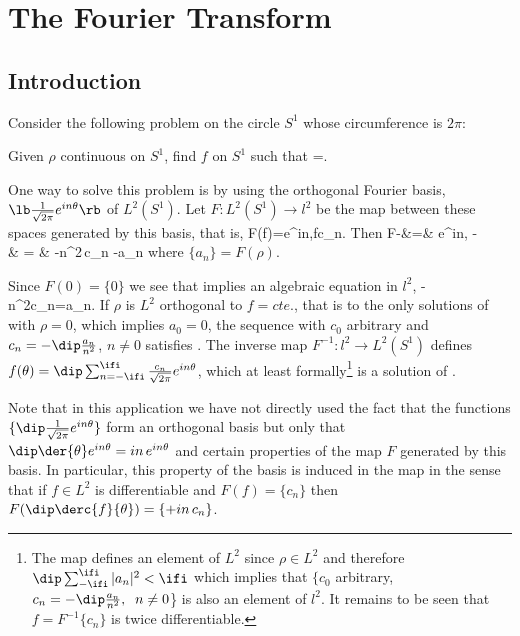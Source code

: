 

\chapter{The Fourier Transform}


\section{Introduction}

Consider the following problem on the circle $S^1$ whose
circumference is $2\pi$:

\noi Given $\rho$ continuous on $S^1$, find $f$ on $S^1$ such that 
 \beq
 =\rho. \label{10.1*}
 \eeq
 
\noi One way to solve this problem is by using the orthogonal
Fourier basis, 
$\lb\frac{1}{\sqrt{2\pi}}e^{in\theta}\rb$ of $L^2(S^1)$.
Let $F:L^2(S^1)\to l^2$ be the map between these spaces generated by this 
basis, that is,
\beq
F(f)=\lb\langle {}e^{in\theta},f\rangle \rb\equiv\lb c_n\rb .
\eeq
Then 
\beq
{}
F\lp{}-\rho\rp &=& \lb\langle {}e^{in\theta},
-\rho\rangle \rb \\ [3mm]
& = & \lb-n^2\,c_n -a_n\rb
\earr
\eeq
where $\{a_n\}=F(\rho)$.

Since $F(0)=\{0\}$ we see that  implies an algebraic 
equation in $l^2$,
\beq
-n^2c_n=a_n.\label{10.2*}
\eeq
If $\rho$ is $L^2$ orthogonal to $f=cte.$, that is to the only solutions of 
with $\rho=0$, which implies $a_0=0$, the sequence with $c_0$
arbitrary and
$c_n=-\dip\frac{a_n}{n^2}$, $n\neq0$ satisfies
. 
The inverse map $F^{-1}:l^2\to L^2(S^1)$ defines 
$f(\theta)=\dip\sum_{n=-\ifi}^{\ifi}\frac{c_n}{\sqrt{2\pi}}e^{in\theta} $,
which at least formally\footnote{The map defines
an element of $L^2$ since $\rho\in L^2$ and therefore $\dip
\sum_{-\ifi}^{\ifi}|a_n|^2<\ifi$ which implies that $\{c_0$
arbitrary, $c_n=-\dip\frac{a_n}{n^2},\;\;n\neq0$\} is also 
an element of $l^2$.
It remains to be seen that $f=F^{-1}\{c_n\}$ is twice differentiable.}
is a solution of .

Note that in this application we have not directly used the fact that
the functions $\{\dip\frac{1}{\sqrt{2\pi}}e^{in\theta}\}$
form an orthogonal basis but only that
$\dip\der{\theta}e^{in\theta}=in\,e^{in\theta}$ and certain properties
of the map $F$ generated by this basis. In particular, this property
of the basis is induced in the map in the sense that if $f\in L^2$ is
differentiable and $F(f)=\{c_n\}$ then
$F(\dip\derc{f}{\theta})=\{+in\,c_n\}$.

